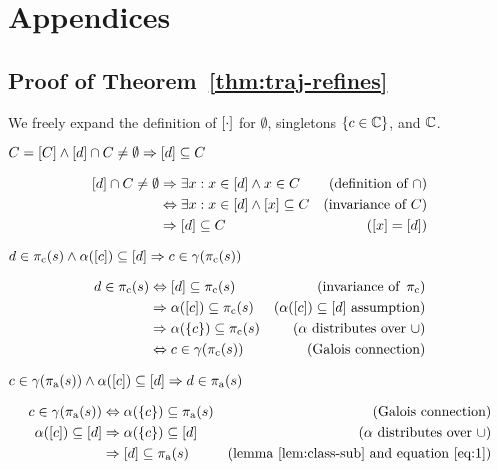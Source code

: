 \section{Appendices}

\subsection{Proof of Theorem~\ref{thm:traj-refines}}

We freely expand the definition of $[\cdot]$ for $\emptyset$, singletons $\{ c \in \mathbb{C} \}$, and $\mathbb{C}$.

\begin{lemma} \label{lem:class-sub}
$C = [C] \wedge [d] \cap C \neq \emptyset \Rightarrow [d] \subseteq C$
\end{lemma}%
%
\begin{align*}
[d] \cap C \neq \emptyset & \Rightarrow \exists x : x \in [d] \wedge x \in C             & (\textrm{definition of } \cap) \\
                              & \Leftrightarrow     \exists x : x \in [d] \wedge [x] \subseteq C & (\textrm{invariance of } C) \\
                              & \Rightarrow [d] \subseteq C                                  & ([x] = [d])
\end{align*}

\begin{lemma} \label{lem:traj-con}
$d \in \operatorname{\pi_{\textrm{c}}}(s) \wedge \alpha([c]) \subseteq [d] \Rightarrow c \in \gamma(\operatorname{\pi_{\textrm{c}}}(s))$
\end{lemma}%
%
\begin{align*}
d \in \operatorname{\pi_{\textrm{c}}}(s) & \Leftrightarrow     [d] \subseteq \operatorname{\pi_{\textrm{c}}}(s)         & (\textrm{invariance of } \operatorname{\pi_{\textrm{c}}}) \\
                     & \Rightarrow \alpha([c]) \subseteq \operatorname{\pi_{\textrm{c}}}(s) & (\alpha([c]) \subseteq [d] \textrm{ assumption}) \\
                     & \Rightarrow \alpha(\{ c \}) \subseteq \operatorname{\pi_{\textrm{c}}}(s) & (\alpha \textrm{ distributes over } \cup) \\
                     & \Leftrightarrow     c \in \gamma(\operatorname{\pi_{\textrm{c}}}(s))             & (\textrm{Galois connection})
\end{align*}

\begin{lemma} \label{lem:traj-ant}
$c \in \gamma(\operatorname{\pi_{\textrm{a}}}(s)) \wedge \alpha([c]) \subseteq [d] \Rightarrow d \in \operatorname{\pi_{\textrm{a}}}(s)$
\end{lemma}%
%
\begin{align}
c \in \gamma(\operatorname{\pi_{\textrm{a}}}(s))      & \Leftrightarrow     \alpha(\{ c \}) \subseteq \operatorname{\pi_{\textrm{a}}}(s) \label{eq:1} & (\textrm{Galois connection}) \\
\alpha([c]) \subseteq [d] & \Rightarrow \alpha(\{ c \}) \subseteq [d]        \nonumber    & (\alpha \textrm{ distributes over } \cup) \\
                                  & \Rightarrow [d] \subseteq \operatorname{\pi_{\textrm{a}}}(s)         \nonumber    & (\textrm{lemma~\ref{lem:class-sub} and equation } \ref{eq:1})
\end{align}

